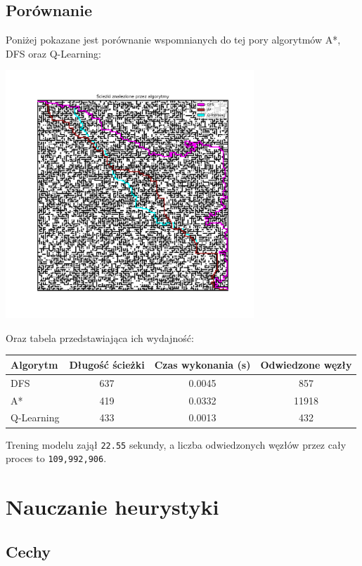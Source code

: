 \documentclass[a4paper,12pt]{article}
\begin{document}
    \newpage
    \subsection{Porównanie}
	Poniżej pokazane jest porównanie wspomnianych do tej pory algorytmów A*, DFS oraz Q-Learning:
    \begin{center}
        \includegraphics[width=0.7\textwidth]{../images/qlearning-vs-others.png}    
    \end{center}

    Oraz tabela przedstawiająca ich wydajność:
    \begin{table}[h!]
\centering
\begin{tabular}{|l|c|c|c|}
\hline
\textbf{Algorytm} & \textbf{Długość ścieżki} & \textbf{Czas wykonania (s)} & \textbf{Odwiedzone węzły} \\
\hline
DFS        & 637  & 0.0045  & 857    \\
A*         & 419  & 0.0332  & 11918  \\
Q-Learning & 433  & 0.0013  & 432    \\
\hline
\end{tabular}
\end{table}

    Trening modelu zajął \texttt{22.55} sekundy, a liczba odwiedzonych węzłów przez cały proces to \texttt{109,992,906}.

    \pagebreak
\section{Nauczanie heurystyki}

\subsection{Cechy}
\end{document}
